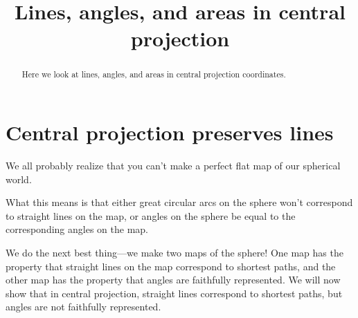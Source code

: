 \documentclass[newpage,hints,handout]{ximera}
\title{Lines, angles, and areas in central projection}
\begin{document}
\begin{abstract}
  Here we look at lines, angles, and areas in central projection coordinates. 
\end{abstract}
\maketitle

\section{Central projection preserves lines}

We all probably realize that you can't make a perfect flat map of our
spherical world.

What this means is that either great circular arcs on the sphere won't
correspond to straight lines on the map, or angles on the sphere be
equal to the corresponding angles on the map.

We do the next best thing---we make two maps of the sphere!  One map
has the property that straight lines on the map correspond to shortest
paths, and the other map has the property that angles are faithfully
represented. We will now show that in central projection, straight
lines correspond to shortest paths, but angles are not faithfully
represented.
\end{document}
